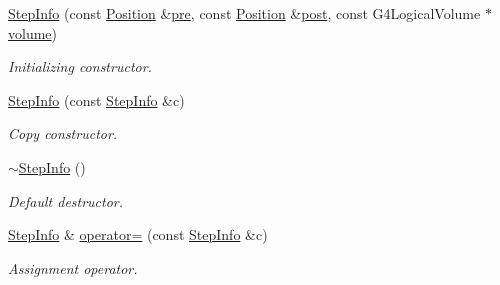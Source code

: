 \begin{DoxyCompactItemize}
\item 
\hyperlink{class_d_d4hep_1_1_simulation_1_1_geant4_material_scanner_1_1_step_info_a036a76d4b5c8de7d90d610417a7e2fa6}{Step\+Info} (const \hyperlink{namespace_d_d4hep_1_1_geometry_a55083902099d03506c6db01b80404900}{Position} \&\hyperlink{class_d_d4hep_1_1_simulation_1_1_geant4_material_scanner_1_1_step_info_a8a5e62192e0103b052eb2c5885366aec}{pre}, const \hyperlink{namespace_d_d4hep_1_1_geometry_a55083902099d03506c6db01b80404900}{Position} \&\hyperlink{class_d_d4hep_1_1_simulation_1_1_geant4_material_scanner_1_1_step_info_a0fd16194cb4eeb622e8e1485d3881688}{post}, const G4\+Logical\+Volume $\ast$\hyperlink{class_d_d4hep_1_1_simulation_1_1_geant4_material_scanner_1_1_step_info_ac413cc2216dfa5d0d174c48fd4acbe5b}{volume})
\begin{DoxyCompactList}\small\item\em Initializing constructor. \end{DoxyCompactList}\item 
\hyperlink{class_d_d4hep_1_1_simulation_1_1_geant4_material_scanner_1_1_step_info_a378c8dfd8190c95fd6ceefe32cdb127f}{Step\+Info} (const \hyperlink{class_d_d4hep_1_1_simulation_1_1_geant4_material_scanner_1_1_step_info}{Step\+Info} \&c)
\begin{DoxyCompactList}\small\item\em Copy constructor. \end{DoxyCompactList}\item 
\hyperlink{class_d_d4hep_1_1_simulation_1_1_geant4_material_scanner_1_1_step_info_a097ddb25fb641476ab568a192dc44531}{$\sim$\+Step\+Info} ()
\begin{DoxyCompactList}\small\item\em Default destructor. \end{DoxyCompactList}\item 
\hyperlink{class_d_d4hep_1_1_simulation_1_1_geant4_material_scanner_1_1_step_info}{Step\+Info} \& \hyperlink{class_d_d4hep_1_1_simulation_1_1_geant4_material_scanner_1_1_step_info_aa9a39c227e53f039bdd9620b1335bd84}{operator=} (const \hyperlink{class_d_d4hep_1_1_simulation_1_1_geant4_material_scanner_1_1_step_info}{Step\+Info} \&c)
\begin{DoxyCompactList}\small\item\em Assignment operator. \end{DoxyCompactList}\end{DoxyCompactItemize}
